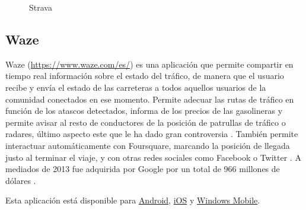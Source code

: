 \begin{figure}[h!btp]
	\begin{adjustbox}{minipage=\linewidth, fbox}
		\centering
		\hspace{10mm}
	\end{adjustbox}
\caption{Strava}
	\label{fig:strava}
\end{figure}

\subsection{Waze}
Waze (\url{https://www.waze.com/es/}) es una aplicación que permite compartir en tiempo real información sobre el estado del tráfico, de manera que el usuario recibe y envía el estado de las carreteras a todos aquellos usuarios de la comunidad conectados en ese momento. Permite adecuar las rutas de tráfico en función de los atascos detectados, informa de los precios de las gasolineras y permite avisar al resto de conductores de la posición de patrullas de tráfico o radares, último aspecto este que le ha dado gran controversia \cite{Cast13}. También permite interactuar automáticamente con Foursquare, marcando la posición de llegada justo al terminar el viaje, y con otras redes sociales como Facebook o Twitter \cite{Pen11}. A mediados de 2013 fue adquirida por Google por un total de 966 millones de dólares \cite{ABC13}.

Esta aplicación está disponible para \href{https://play.google.com/store/apps/details?id=com.waze}{Android}, \href{https://itunes.apple.com/us/app/waze-social-gps-traffic/id323229106?mt=8}{iOS} y \href{https://www.microsoft.com/es-es/store/apps/waze/9wzdncrfj2m3}{Windows Mobile}.

